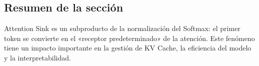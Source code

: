 \subsection{Resumen de la sección}

Attention Sink es un subproducto de la normalización del Softmax: el primer token se convierte en el «receptor predeterminado» de la atención. Este fenómeno tiene un impacto importante en la gestión de KV Cache, la eficiencia del modelo y la interpretabilidad.

